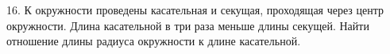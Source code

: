 16. К окружности проведены касательная и секущая, проходящая через центр окружности. Длина касательной в три раза меньше длины секущей. Найти отношение длины радиуса окружности к длине касательной.\\
